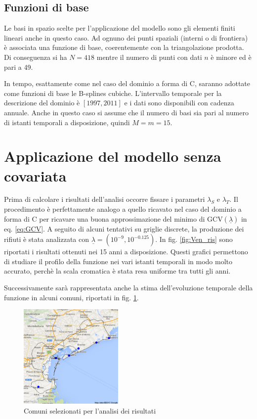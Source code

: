 \documentclass[a4paper,11pt,twoside,openright]{book}							%
\begin{document}
\subsection{Funzioni di base}
Le basi in spazio scelte per l'applicazione del modello sono gli elementi finiti lineari anche in questo caso. Ad ognuno dei punti spaziali (interni o di frontiera) è associata una funzione di base, coerentemente con la triangolazione prodotta. Di conseguenza si ha $N=418$ mentre il numero di punti con dati $n$ è minore ed è pari a 49.

In tempo, esattamente come nel caso del dominio a forma di C, saranno adottate come funzioni di base le B-splines cubiche. L'intervallo temporale per la descrizione del dominio è $[1997,2011]$ e i dati sono disponibili con cadenza annuale. Anche in questo caso si assume che il numero di basi sia pari al numero di istanti temporali a disposizione, quindi $M=m=15$.

\section{Applicazione del modello senza covariata}

Prima di calcolare i risultati dell'analisi occorre fissare i parametri $\lambda_S$ e $\lambda_T$. Il procedimento è perfettamente analogo a quello ricavato nel caso del dominio a forma di C per ricavare una buona approssimazione del minimo di $\mathrm{GCV}(\underline \lambda)$ in eq. \ref{eq:GCV}. A seguito di alcuni tentativi su griglie discrete, la produzione dei rifiuti è stata analizzata con $\underline \lambda = (10^{-9}, 10^{-0.125})$. In fig. \ref{fig:Ven_ris} sono riportati i risultati ottenuti nei 15 anni a disposizione. Questi grafici permettono di studiare il profilo della funzione nei vari istanti temporali in modo molto accurato, perchè la scala cromatica è stata resa uniforme tra tutti gli anni.

Successivamente sarà rappresentata anche la stima dell'evoluzione temporale della funzione in alcuni comuni, riportati in fig. \ref{fig:Ven_selected}.
\newline
\newline
\newline
\newline
\newline
\begin{figure}[h]
	\centering
	\includegraphics[width=0.45\textwidth]{Immagini/comuni_selezionati.png}   
   \caption{Comuni selezionati per l'analisi dei risultati}
	\label{fig:Ven_selected}
\end{figure}
\end{document}
